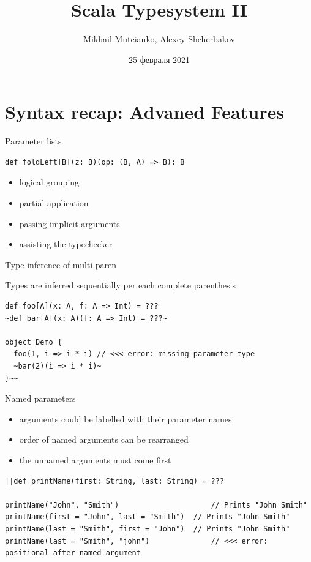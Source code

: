 \documentclass[aspectratio=169]{beamer}
\title{Scala Typesystem II}
\author{Mikhail Mutcianko, Alexey Shcherbakov}
\institute{СПБгУ, СП}
\date{25 февраля 2021}
\begin{document}
\frame{\titlepage}

\section{Syntax recap: Advaned Features}

\begin{frame}[fragile]{Parameter lists}
\begin{lstlisting}[style=scala]
def foldLeft[B](z: B)(op: (B, A) => B): B
\end{lstlisting}
\begin{itemize}
  \item logical grouping
  \item partial application
  \item passing implicit arguments
  \item assisting the typechecker
\end{itemize}
\end{frame}

\begin{frame}[fragile]{Type inference of multi-paren}
  \begin{block}{}
    Types are inferred sequentially per \alert{each complete} parenthesis
  \end{block}
  \vspace{2em}
\begin{lstlisting}[style=scala]
def foo[A](x: A, f: A => Int) = ???
~def bar[A](x: A)(f: A => Int) = ???~

object Demo {
  foo(1, i => i * i) // <<< error: missing parameter type
  ~bar(2)(i => i * i)~
}~~
\end{lstlisting}
\end{frame}

\begin{frame}[fragile]{Named parameters}
\begin{itemize}
  \item arguments could be labelled with their parameter names
  \item order of named arguments can be rearranged
  \item the unnamed arguments must come first
\end{itemize}
\pause
\vspace{2em}
\begin{lstlisting}[style=scala]
||def printName(first: String, last: String) = ???

printName("John", "Smith")                     // Prints "John Smith"
printName(first = "John", last = "Smith")  // Prints "John Smith"
printName(last = "Smith", first = "John")  // Prints "John Smith"
printName(last = "Smith", "john")              // <<< error: positional after named argument
\end{lstlisting}
\end{frame}
\end{document}
